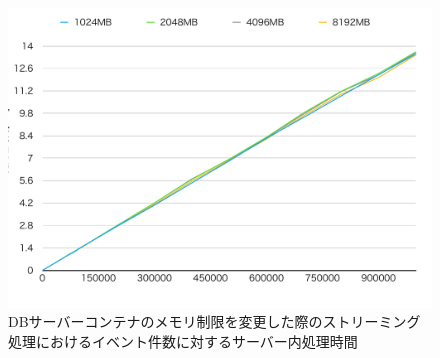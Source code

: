\documentclass[../../../../../main]{subfiles}
\begin{document}
    \begin{figure}[H]
        \centering
        \includegraphics[width=12cm]{graph}
        \caption{DBサーバーコンテナのメモリ制限を変更した際のストリーミング処理におけるイベント件数に対するサーバー内処理時間}
        \label{fig:stream-change-db-memory-limit-server-time-app_4_8192-db_400}
    \end{figure}
\end{document}
